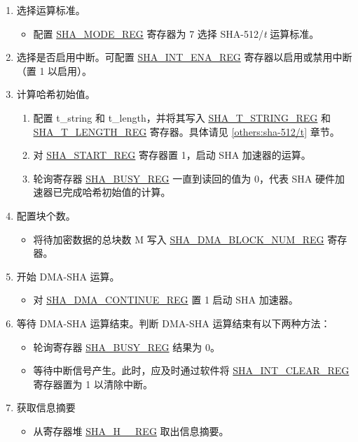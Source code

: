 \documentclass[main\_\_CN.tex]{subfiles}
\begin{document}
\begin{enumerate}
    \item 选择运算标准。
        \begin{itemize}
            \item 配置 \hyperref[regdesc:SHAMODEREG]{SHA\_MODE\_REG} 寄存器为 7 选择 SHA-512/{\it{t}} 运算标准。
        \end{itemize}
        
    \item 选择是否启用中断。可配置 \hyperref[regdesc:SHAINTENAREG]{SHA\_INT\_ENA\_REG} 寄存器以启用或禁用中断（置 1 以启用）。
    
    \item 计算哈希初始值。
        \begin{enumerate}
            \item 配置 t\_string 和 t\_length，并将其写入 \hyperref[regdesc:SHATSTRINGREG]{SHA\_T\_STRING\_REG} 和 \hyperref[regdesc:SHATLENGTHREG]{SHA\_T\_LENGTH\_REG} 寄存器。具体请见 \ref{others:sha-512/t} 章节。
            \item 对 \hyperref[regdesc:SHASTARTREG]{SHA\_START\_REG} 寄存器置 1，启动 SHA 加速器的运算。
            \item 轮询寄存器 \hyperref[regdesc:SHABUSYREG]{SHA\_BUSY\_REG} 一直到读回的值为 0，代表 SHA 硬件加速器已完成哈希初始值的计算。
        \end{enumerate}
        
    \item 配置块个数。
        \begin{itemize}
            \item 将待加密数据的总块数 M 写入  \hyperref[regdesc:SHADMABLOCKNUMREG]{SHA\_DMA\_BLOCK\_NUM\_REG} 寄存器。
        \end{itemize}
        
    \item 开始 DMA-SHA 运算。
        \begin{itemize}
            \item 对 \hyperref[regdesc:SHADMACONTINUEREG]{SHA\_DMA\_CONTINUE\_REG} 置 1 启动 SHA 加速器。
        \end{itemize}
        
    \item 等待 DMA-SHA 运算结束。判断 DMA-SHA 运算结束有以下两种方法：
        \begin{itemize}
            \item 轮询寄存器 \hyperref[regdesc:SHABUSYREG]{SHA\_BUSY\_REG} 结果为 0。
            \item 等待中断信号产生。此时，应及时通过软件将 \hyperref[regdesc:SHAINTCLEARREG]{SHA\_INT\_CLEAR\_REG} 寄存器置为 1 以清除中断。
        \end{itemize} 
        
    \item 获取信息摘要
        \begin{itemize}
            \item 从寄存器堆 \hyperref[regdesc:SHAHNREG]{SHA\_H\_\_REG} 取出信息摘要。
        \end{itemize}
\end{enumerate}
\end{document}
